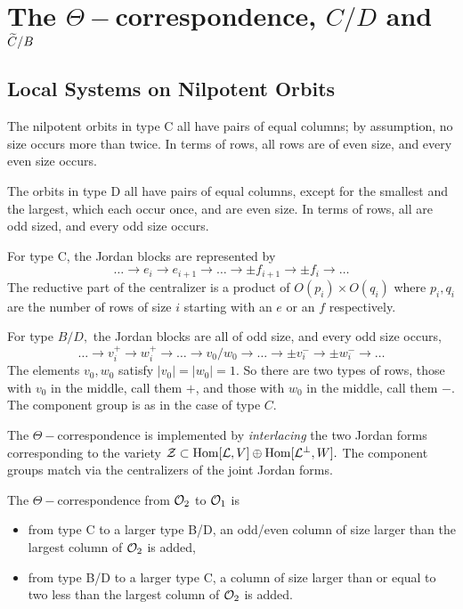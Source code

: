 \documentclass[11pt ,reqno]{amsart}
\begin{document}
\newpage
\section{The $\Theta-$correspondence, $C/D$ and ${\widetilde C}/B$}
\subsection{Local Systems on Nilpotent Orbits} The nilpotent orbits in
type C all have pairs of equal columns; by assumption, no size occurs
more than twice. In terms of rows, all rows are of even size, and
every even size occurs.  


The orbits in type D all have pairs of equal columns, except for the
smallest and the largest, which each occur once, and are even size. In
terms of rows, all are odd sized, and every odd size occurs.   

For type C, the Jordan blocks are represented by 
$$
\dots \longrightarrow e_i\longrightarrow e_{i+1}\longrightarrow\dots
\longrightarrow \pm f_{i+1}\longrightarrow \pm f_i\longrightarrow
\dots 
$$
The reductive part of the centralizer is a product of  $O(p_i)\times O(q_i)$ where $p_i,q_i$ are the number of rows of size $i$ starting with an $e$ or an $f$ respectively.

For type $B/D,$ the Jordan blocks are all of odd size, and every odd size occurs,
$$
\dots \longrightarrow v_i^+\longrightarrow
w_i^+\longrightarrow\dots\longrightarrow v_0/w_0\longrightarrow\dots\longrightarrow \pm v_i^-\longrightarrow \pm w^-_i\longrightarrow\dots 
$$
The elements $v_0,w_0$ satisfy $|v_0|=|w_0|= 1.$ So there are two types of rows,
those with  $v_0$ in the middle, call them $+$, and those with $w_0$
in the middle, call them $-$.
The component group is as in the case of type $C.$ 

The $\Theta-$correspondence is implemented by \textit{interlacing} the two Jordan forms corresponding to the variety ${\mathcal Z}\subset{\operatorname{Hom}}[{\mathcal L},V]\oplus{\operatorname{Hom}}[{\mathcal L}^\perp, W].$  The component groups match via the centralizers of the joint Jordan forms.


The $\Theta-$correspondence from $\mathcal O_2$ to $\mathcal O_1$ is
\begin{itemize}
\item from type C to a larger type B/D, an odd/even column of size  larger
  than the largest column of $\mathcal O_2$  is added,
\item from type B/D to a larger type C, a column of size larger than or
  equal to  two less than the largest column of $\mathcal O_2$ is added. 
\end{itemize}
 
\end{document}
